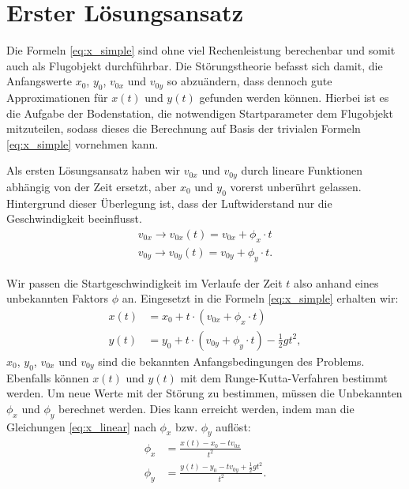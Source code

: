 \section{Erster Lösungsansatz
\label{perturbation:section:ersterloesungsansatz}}

Die Formeln \eqref{eq:x_simple} sind ohne viel Rechenleistung berechenbar und somit auch als Flugobjekt durchführbar.
Die Störungstheorie befasst sich damit, die Anfangswerte $x_0$, $y_0$, $v_{0x}$ und $v_{0y}$ so abzuändern,
dass dennoch gute Approximationen für $x(t)$ und $y(t)$ gefunden werden können.
Hierbei ist es die Aufgabe der Bodenstation, die notwendigen Startparameter dem Flugobjekt mitzuteilen,
sodass dieses die Berechnung auf Basis der trivialen Formeln \ref{eq:x_simple}  vornehmen kann.

Als ersten Lösungsansatz haben wir $v_{0x}$ und $v_{0y}$ durch lineare Funktionen abhängig von der Zeit ersetzt, aber $x_0$ und $y_0$ vorerst unberührt gelassen.
Hintergrund dieser Überlegung ist, dass der Luftwiderstand nur die Geschwindigkeit beeinflusst.
\begin{equation*}
	\begin{aligned}
		v_{0x} \rightarrow v_{0x}(t) = v_{0x} + \phi_x \cdot t\\
		v_{0y} \rightarrow v_{0y}(t) = v_{0y} + \phi_y \cdot t.
	\end{aligned}
\end{equation*}



Wir passen die Startgeschwindigkeit im Verlaufe der Zeit $t$ also anhand eines unbekannten Faktors $\phi$ an.
Eingesetzt in die Formeln \eqref{eq:x_simple} erhalten wir:
\begin{equation}\label{eq:x_linear}
\begin{aligned}
    x(t) &= x_0 + t \cdot (v_{0x} + \phi_x \cdot t) \\
    y(t) &= y_0 + t \cdot (v_{0y} + \phi_y \cdot t) - \frac{1}{2}gt^2,
\end{aligned}
\end{equation}
$x_0$, $y_0$, $v_{0x}$ und $v_{0y}$ sind die bekannten Anfangsbedingungen des Problems.
Ebenfalls können $x(t)$ und $y(t)$ mit dem Runge-Kutta-Verfahren bestimmt werden.
Um neue Werte mit der Störung zu bestimmen, müssen die Unbekannten $\phi_x$ und $\phi_y$ berechnet werden.
Dies kann erreicht werden, indem man die Gleichungen \eqref{eq:x_linear} nach $\phi_x$ bzw. $\phi_y$ auflöst:
\begin{equation}
	\begin{aligned}
	\phi_x &= \frac{x(t) - x_0 - tv_{0x}}{t^2}\\
	\phi_y &= \frac{y(t) - y_0 - tv_{0y} + \frac{1}{2}gt^2}{t^2}.
	\end{aligned}
\end{equation}

